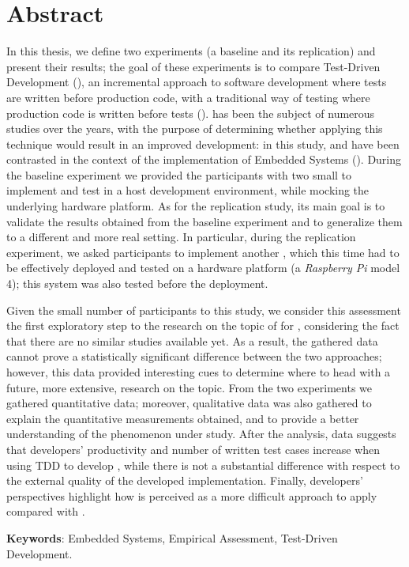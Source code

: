 \chapter*{Abstract}
In this thesis, we define two experiments (\ie a baseline and its replication) and present their results; the goal of these experiments is to compare Test-Driven Development (\tdd), an incremental approach to software development where tests are written before production code, with a traditional way of testing where production code is written before tests (\ie \notdd). 
\tdd has been the subject of numerous studies over the years, with the purpose of determining whether applying this technique would result in an improved development: in this study, \tdd and \notdd have been contrasted in the context of the implementation of Embedded Systems (\ess).
During the baseline experiment we provided the participants with two small \ess to implement and test in a host development environment, while mocking the underlying hardware platform.
As for the replication study, its main goal is to validate the results obtained from the baseline experiment and to generalize them to a different and more real setting. 
In particular, during the replication experiment, we asked participants to implement another \es, which this time had to be effectively deployed and tested on a hardware platform (\ie a \textit{Raspberry Pi} model 4); this system was also tested before the deployment.

Given the small number of participants to this study, we consider this assessment the first exploratory step to the research on the topic of \tdd for \ess, considering the fact that there are no similar studies available yet. As a result, the gathered data cannot prove a statistically significant difference between the two approaches; however, this data provided interesting cues to determine where to head with a future, more extensive, research on the topic.
From the two experiments we gathered quantitative data; moreover, qualitative data was also gathered to explain the quantitative measurements obtained, and to provide a better understanding of the phenomenon under study.
After the analysis, data suggests that developers' productivity and number of written test cases increase when using TDD to develop \ess, while there is not a substantial difference with respect to the external quality of the developed implementation. 
Finally, developers' perspectives highlight how \tdd is perceived as a more difficult approach to apply compared with \notdd.

\noindent \textbf{Keywords}: Embedded Systems, Empirical Assessment, Test-Driven Development.